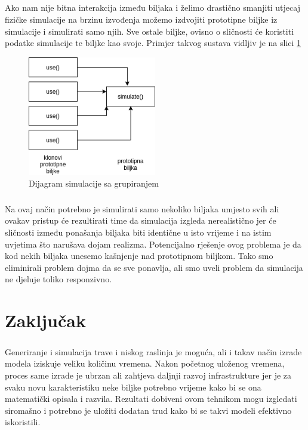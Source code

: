 \documentclass[times, utf8, diplomski]{fer}
\begin{document}
\paragraph{}
Ako nam nije bitna interakcija između biljaka i želimo drastično smanjiti utjecaj 
fizičke simulacije na brzinu izvođenja možemo izdvojiti prototipne biljke iz simulacije i 
simulirati samo njih. Sve ostale biljke, ovisno o sličnosti će koristiti podatke simulacije 
te biljke kao svoje. Primjer takvog sustava vidljiv je na slici \ref{fig:531-3}
\begin{figure}[h]
	\centering
	\includegraphics[width=0.5\textwidth]{img/531-3}
	\caption{Dijagram simulacije sa grupiranjem}
	\label{fig:531-3}
\end{figure}
\paragraph{}
Na ovaj način potrebno je simulirati samo nekoliko biljaka umjesto svih ali ovakav pristup 
će rezultirati time da simulacija izgleda nerealistično jer će sličnosti između ponašanja 
biljaka biti identične u isto vrijeme i na istim uvjetima što narušava dojam realizma. 
Potencijalno rješenje ovog problema je da kod nekih biljaka unesemo kašnjenje nad 
prototipnom biljkom. Tako smo eliminirali problem dojma da se sve ponavlja, ali smo 
uveli problem da simulacija ne djeluje toliko responzivno.

\chapter{Zaključak}
\paragraph{}
Generiranje i simulacija trave i niskog raslinja je moguća, ali i takav način izrade 
modela iziskuje veliku količinu vremena. Nakon početnog uloženog vremena, proces same izrade 
je ubrzan ali zahtjeva daljnji razvoj infrastrukture jer je za svaku novu karakteristiku 
neke biljke potrebno vrijeme kako bi se ona matematički opisala i razvila. Rezultati 
dobiveni ovom tehnikom mogu izgledati siromašno i potrebno je uložiti dodatan trud kako bi 
se takvi modeli efektivno iskoristili.
\end{document}
